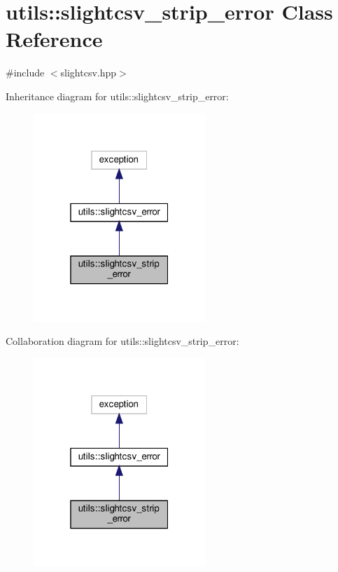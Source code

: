 \hypertarget{classutils_1_1slightcsv__strip__error}{}\section{utils\+:\+:slightcsv\+\_\+strip\+\_\+error Class Reference}
\label{classutils_1_1slightcsv__strip__error}


{\ttfamily \#include $<$slightcsv.\+hpp$>$}



Inheritance diagram for utils\+:\+:slightcsv\+\_\+strip\+\_\+error\+:\nopagebreak
\begin{figure}[H]
\begin{center}
\leavevmode
\includegraphics[width=184pt]{classutils_1_1slightcsv__strip__error__inherit__graph}
\end{center}
\end{figure}


Collaboration diagram for utils\+:\+:slightcsv\+\_\+strip\+\_\+error\+:\nopagebreak
\begin{figure}[H]
\begin{center}
\leavevmode
\includegraphics[width=184pt]{classutils_1_1slightcsv__strip__error__coll__graph}
\end{center}
\end{figure}



